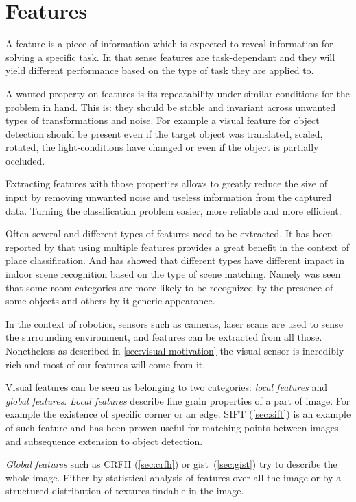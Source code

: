 \section{Features}
A feature is a piece of information which is expected to reveal information for
solving a specific task. In that sense features are task-dependant and they will
yield different performance based on the type of task they are applied to.

A wanted property on features is its repeatability under similar conditions for
the problem in hand. This is: they should be stable and invariant across
unwanted types of transformations and noise. For example a visual feature for
object detection should be present even if the target object was translated,
scaled, rotated, the light-conditions have changed or even if the object is
partially occluded.

Extracting features with those properties allows to greatly reduce the size of
input by removing unwanted noise and useless information from the captured data.
Turning the classification problem easier, more reliable and more efficient.

Often several and different types of features need to be extracted. It has been
reported by \cite{pronobis2010ijrr} that using multiple features provides a
great benefit in the context of place classification.
And \cite{quattoni2009recognizing} has showed that different types have
different impact in indoor scene recognition based on the type of scene
matching. Namely was seen that some room-categories are more likely to be
recognized by the presence of some objects and others by it generic appearance.

In the context of robotics, sensors such as cameras, laser scans are used to
sense the surrounding environment, and features can be extracted from all those.
Nonetheless as described in \autoref{sec:visual-motivation} the visual sensor is
incredibly rich and most of our features will come from it.

Visual features can be seen as belonging to two categories:
\emph{local features} and \emph{global features}.
\emph{Local features} describe fine grain properties of a part of image.
For example the existence of specific corner or an edge. \Gls{SIFT}
(\autoref{sec:sift}) is an example of such feature and has been proven useful
for matching points between images and subsequence extension to object detection.

\emph{Global features} such as \gls{CRFH} (\autoref{sec:crfh}) or
{gist}~(\autoref{sec:gist}) try to describe the whole image. Either by
statistical analysis of features over all the image or by a structured
distribution of textures findable in the image.

